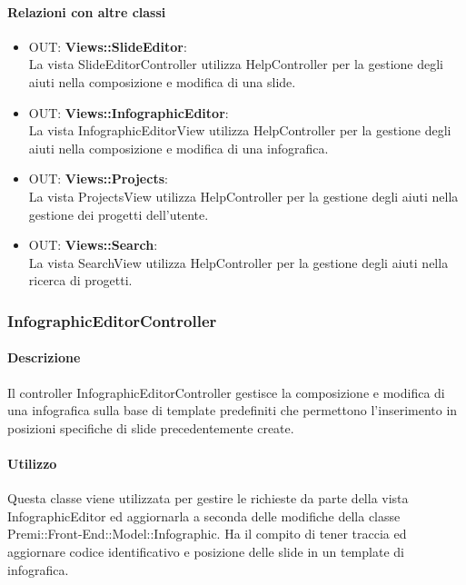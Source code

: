 	\paragraph{Relazioni con altre classi}
	\begin{itemize}
	 \item OUT: \textbf{Views::SlideEditor}:\\
		La vista SlideEditorController utilizza HelpController per la gestione degli aiuti nella composizione e modifica di una slide.
	 \item OUT: \textbf{Views::InfographicEditor}:\\
		La vista InfographicEditorView utilizza HelpController per la gestione degli aiuti nella composizione e modifica di una infografica.
	 \item OUT: \textbf{Views::Projects}:\\
		La vista ProjectsView utilizza HelpController per la gestione degli aiuti nella gestione dei progetti dell'utente.
	 \item OUT: \textbf{Views::Search}:\\
		La vista SearchView utilizza HelpController per la gestione degli aiuti nella ricerca di progetti.
	\end{itemize}


\subsubsection{InfographicEditorController}
	\paragraph{Descrizione}
		Il controller InfographicEditorController gestisce la composizione e modifica di una infografica sulla base di template predefiniti che permettono l'inserimento in posizioni specifiche di slide precedentemente create.
	
	\paragraph{Utilizzo} 
	
		Questa classe viene utilizzata per gestire le richieste da parte della vista InfographicEditor ed aggiornarla a seconda delle modifiche della classe Premi::Front-End::Model::Infographic.
		Ha il compito di tener traccia ed aggiornare codice identificativo e posizione delle slide in un template di infografica.
